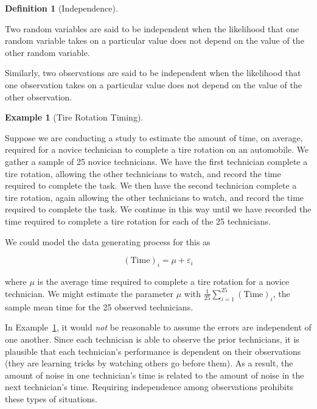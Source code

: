 \documentclass[
  letterpaper,
  DIV=11,
  numbers=noendperiod]{scrreprt}
\theoremstyle{plain}
\theoremstyle{definition}
\newtheorem{example}{Example}[chapter]
\theoremstyle{definition}
\newtheorem{definition}{Definition}[chapter]
\theoremstyle{remark}
\begin{document}
\begin{definition}[Independence]\protect\hypertarget{def-independence}{}\label{def-independence}

Two random variables are said to be independent when the likelihood that
one random variable takes on a particular value does not depend on the
value of the other random variable.

Similarly, two observations are said to be independent when the
likelihood that one observation takes on a particular value does not
depend on the value of the other observation.

\end{definition}

\begin{example}[Tire Rotation
Timing]\protect\hypertarget{exm-tire-rotation}{}\label{exm-tire-rotation}

Suppose we are conducting a study to estimate the amount of time, on
average, required for a novice technician to complete a tire rotation on
an automobile. We gather a sample of 25 novice technicians. We have the
first technician complete a tire rotation, allowing the other
technicians to watch, and record the time required to complete the task.
We then have the second technician complete a tire rotation, again
allowing the other technicians to watch, and record the time required to
complete the task. We continue in this way until we have recorded the
time required to complete a tire rotation for each of the 25
technicians.

We could model the data generating process for this as

\[(\text{Time})_i = \mu + \varepsilon_i\]

where \(\mu\) is the average time required to complete a tire rotation
for a novice technician. We might estimate the parameter \(\mu\) with
\(\frac{1}{25}\sum_{i=1}^{25} (\text{Time})_i\), the sample mean time
for the 25 observed technicians.

\end{example}

In Example~\ref{exm-tire-rotation}, it would \emph{not} be reasonable to
assume the errors are independent of one another. Since each technician
is able to observe the prior technicians, it is plausible that each
technician's performance is dependent on their observations (they are
learning tricks by watching others go before them). As a result, the
amount of noise in one technician's time is related to the amount of
noise in the next technician's time. Requiring independence among
observations prohibits these types of situations.
\end{document}
